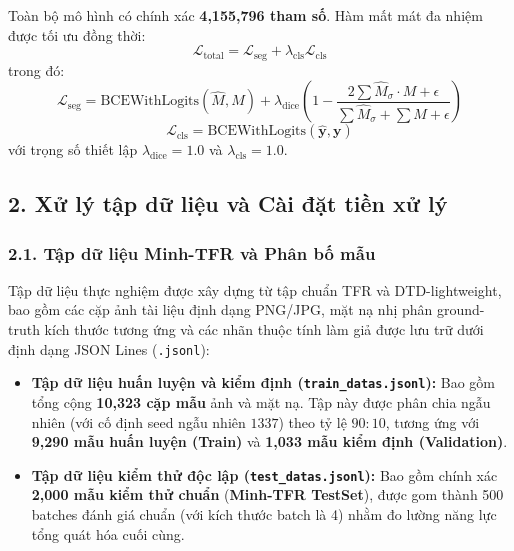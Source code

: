 Toàn bộ mô hình có chính xác \textbf{4,155,796 tham số}. Hàm mất mát đa nhiệm được tối ưu đồng thời:
\begin{equation}
\mathcal{L}_{\text{total}} = \mathcal{L}_{\text{seg}} + \lambda_{\text{cls}} \mathcal{L}_{\text{cls}}
\end{equation}
trong đó:
\begin{equation}
\mathcal{L}_{\text{seg}} = \text{BCEWithLogits}(\hat{M}, M) + \lambda_{\text{dice}} \left( 1 - \frac{2 \sum \hat{M}_{\sigma} \cdot M + \epsilon}{\sum \hat{M}_{\sigma} + \sum M + \epsilon} \right)
\end{equation}
\begin{equation}
\mathcal{L}_{\text{cls}} = \text{BCEWithLogits}(\hat{\mathbf{y}}, \mathbf{y})
\end{equation}
với trọng số thiết lập $\lambda_{\text{dice}} = 1.0$ và $\lambda_{\text{cls}} = 1.0$.

\subsection{2. Xử lý tập dữ liệu và Cài đặt tiền xử lý}

\subsubsection{2.1. Tập dữ liệu Minh-TFR và Phân bố mẫu}
\indent\indent Tập dữ liệu thực nghiệm được xây dựng từ tập chuẩn TFR và DTD-lightweight, bao gồm các cặp ảnh tài liệu định dạng PNG/JPG, mặt nạ nhị phân ground-truth kích thước tương ứng và các nhãn thuộc tính làm giả được lưu trữ dưới định dạng JSON Lines (\texttt{.jsonl}):
\begin{itemize}[label={--}, itemsep=2pt]
    \item \textbf{Tập dữ liệu huấn luyện và kiểm định (\texttt{train\_datas.jsonl}):} Bao gồm tổng cộng \textbf{10,323 cặp mẫu} ảnh và mặt nạ. Tập này được phân chia ngẫu nhiên (với cố định seed ngẫu nhiên $1337$) theo tỷ lệ $90:10$, tương ứng với \textbf{9,290 mẫu huấn luyện (Train)} và \textbf{1,033 mẫu kiểm định (Validation)}.
    \item \textbf{Tập dữ liệu kiểm thử độc lập (\texttt{test\_datas.jsonl}):} Bao gồm chính xác \textbf{2,000 mẫu kiểm thử chuẩn} (\textbf{Minh-TFR TestSet}), được gom thành 500 batches đánh giá chuẩn (với kích thước batch là 4) nhằm đo lường năng lực tổng quát hóa cuối cùng.
\end{itemize}


